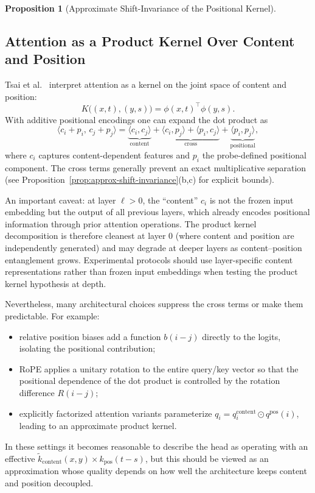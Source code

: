 \documentclass[11pt]{article}
\newtheorem{proposition}[theorem]{Proposition}
\theoremstyle{definition}
\begin{document}
\begin{proposition}[Approximate Shift-Invariance of the Positional Kernel]
\begin{enumerate}
\end{enumerate}
\end{proposition}

\subsection{Attention as a Product Kernel Over Content and Position}

Tsai et al.\ \cite{tsai2019transformer} interpret attention as a kernel on the joint space of content and position:
\[
K\big((x,t),(y,s)\big) = \phi(x,t)^\top \phi(y,s).
\]
With additive positional encodings one can expand the dot product as
\[
\langle c_i + p_i,\, c_j + p_j \rangle = \underbrace{\langle c_i, c_j\rangle}_{\text{content}} + \underbrace{\langle c_i, p_j\rangle + \langle p_i, c_j\rangle}_{\text{cross}} + \underbrace{\langle p_i, p_j\rangle}_{\text{positional}},
\]
where \(c_i\) captures content-dependent features and \(p_i\) the probe-defined positional component. The cross terms generally prevent an exact multiplicative separation (see Proposition~\ref{prop:approx-shift-invariance}(b,c) for explicit bounds).

An important caveat: at layer $\ell > 0$, the ``content'' $c_i$ is not the frozen input embedding but the output of all previous layers, which already encodes positional information through prior attention operations. The product kernel decomposition is therefore cleanest at layer 0 (where content and position are independently generated) and may degrade at deeper layers as content--position entanglement grows. Experimental protocols should use layer-specific content representations rather than frozen input embeddings when testing the product kernel hypothesis at depth.

Nevertheless, many architectural choices suppress the cross terms or make them predictable. For example:
\begin{itemize}
    \item relative position biases add a function \(b(i-j)\) directly to the logits, isolating the positional contribution;
    \item RoPE applies a unitary rotation to the entire query/key vector so that the positional dependence of the dot product is controlled by the rotation difference \(R(i-j)\);
    \item explicitly factorized attention variants parameterize \(q_i = q^{\text{content}}_i \odot q^{\text{pos}}(i)\), leading to an approximate product kernel.
\end{itemize}
In these settings it becomes reasonable to describe the head as operating with an effective \(\tilde{k}_{\text{content}}(x,y) \times k_{\text{pos}}(t-s)\), but this should be viewed as an approximation whose quality depends on how well the architecture keeps content and position decoupled.
\end{document}
